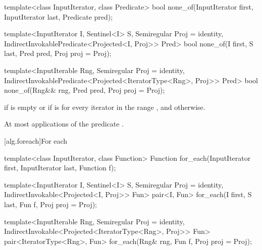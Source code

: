 %
\begin{removedblock}
\begin{itemdecl}
template<class InputIterator, class Predicate>
  bool none_of(InputIterator first, InputIterator last, Predicate pred);
\end{itemdecl}
\end{removedblock}
\begin{addedblock}
\begin{itemdecl}
template<InputIterator I, Sentinel<I> S, Semiregular Proj = identity,
    IndirectInvokablePredicate<Projected<I, Proj>> Pred>
  bool none_of(I first, S last, Pred pred, Proj proj = Proj{});

template<InputIterable Rng, Semiregular Proj = identity,
    IndirectInvokablePredicate<Projected<IteratorType<Rng>, Proj>> Pred>
  bool none_of(Rng&& rng, Pred pred, Proj proj = Proj{});
\end{itemdecl}
\end{addedblock}

\begin{itemdescr}
\pnum
\returns {} if
 is empty or if
is  for every iterator  in the range ,
and  otherwise.

\pnum
\complexity At most  applications of the predicate
.
\end{itemdescr}

[alg.foreach]{For each}

%
\begin{removedblock}
\begin{itemdecl}
template<class InputIterator, class Function>
  Function for_each(InputIterator first, InputIterator last, Function f);
\end{itemdecl}
\end{removedblock}
\begin{addedblock}
\begin{itemdecl}
template<InputIterator I, Sentinel<I> S, Semiregular Proj = identity,
    IndirectInvokable<Projected<I, Proj>> Fun>
  pair<I, Fun>
    for_each(I first, S last, Fun f, Proj proj = Proj{});

template<InputIterable Rng, Semiregular Proj = identity,
    IndirectInvokable<Projected<IteratorType<Rng>, Proj>> Fun>
  pair<IteratorType<Rng>, Fun>
    for_each(Rng& rng, Fun f, Proj proj = Proj{});
\end{itemdecl}
\end{addedblock}

